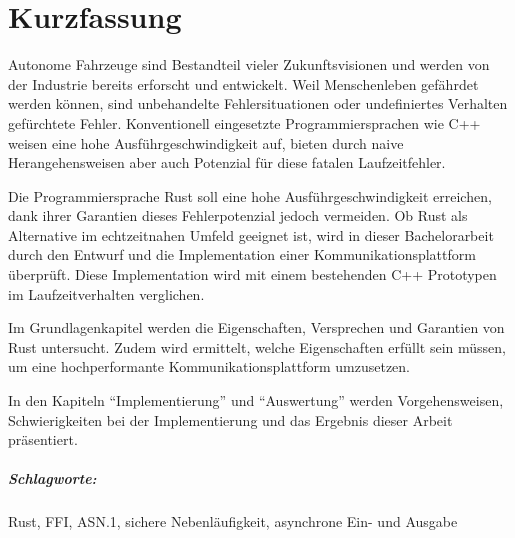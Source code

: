 \chapter*{Kurzfassung}


Autonome Fahrzeuge sind Bestandteil vieler Zukunftsvisionen und werden von der Industrie bereits erforscht und entwickelt.
Weil Menschenleben gefährdet werden können, sind unbehandelte Fehlersituationen oder undefiniertes Verhalten gefürchtete Fehler.
Konventionell eingesetzte Programmiersprachen wie C++ weisen eine hohe Ausführgeschwindigkeit auf, bieten durch naive Herangehensweisen aber auch Potenzial für diese fatalen Laufzeitfehler.

Die Programmiersprache Rust soll eine hohe Ausführgeschwindigkeit erreichen, dank ihrer Garantien dieses Fehlerpotenzial jedoch vermeiden.
Ob Rust als Alternative im echtzeitnahen Umfeld geeignet ist, wird in dieser Bachelorarbeit durch den Entwurf und die Implementation einer Kommunikationsplattform überprüft.
Diese Implementation wird mit einem bestehenden C++ Prototypen im Laufzeitverhalten verglichen.



Im Grundlagenkapitel werden  die Eigenschaften, Versprechen und Garantien von Rust untersucht.
Zudem wird ermittelt, welche Eigenschaften erfüllt sein müssen, um eine hochperformante Kommunikationsplattform umzusetzen.

In den Kapiteln \enquote{Implementierung} und \enquote{Auswertung} werden Vorgehensweisen, Schwierigkeiten bei der Implementierung und das Ergebnis dieser Arbeit präsentiert.

\paragraph{Schlagworte:} Rust, FFI, ASN.1, sichere Nebenläufigkeit, asynchrone Ein- und Ausgabe